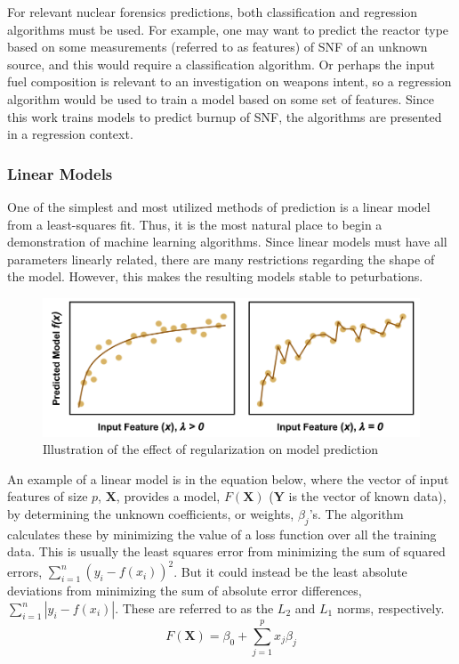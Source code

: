 \setlength\abovedisplayskip{2.5pt}

For relevant nuclear forensics predictions, both classification and regression
algorithms must be used.  For example, one may want to predict the reactor type
based on some measurements (referred to as features) of \gls{SNF} of an unknown
source, and this would require a classification algorithm. Or perhaps the input
fuel composition is relevant to an investigation on weapons intent, so a
regression algorithm would be used to train a model based on some set of
features.  Since this work trains models to predict burnup of \gls{SNF}, the
algorithms are presented in a regression context.

\subsubsection{Linear Models}
\label{sec:linear}

One of the simplest and most utilized methods of prediction is a linear model
from a least-squares fit. Thus, it is the most natural place to begin a
demonstration of machine learning algorithms. Since linear models must have all
parameters linearly related, there are many restrictions regarding the shape of
the model. However, this makes the resulting models stable to peturbations. 

\begin{figure}[!htb]
  \centering
  \includegraphics[width=\linewidth]{./chapters/litrev/regularization.png}
  \caption{Illustration of the effect of regularization on model prediction}
  \label{fig:reg}
\end{figure}

An example of a linear model is in the equation below, where the vector of
input features of size $p$, $\boldsymbol{X}$, provides a model,
$F(\boldsymbol{X})$ ($\boldsymbol{Y}$ is the vector of known
data), by determining the unknown coefficients, or weights,
$\beta_{j}$'s. The algorithm calculates these by minimizing the value of a loss
function over all the training data.  This is usually the least squares error
from minimizing the sum of squared errors, $\sum_{i=1}^{n} (y_i - f(x_i))^2$.
But it could instead be the least absolute deviations from minimizing the sum
of absolute error differences, $\sum_{i=1}^{n} |y_i - f(x_i)|$. These are
referred to as the $L_2$ and $L_1$ norms, respectively.  
\begin{equation}
  F(\boldsymbol{X}) = \beta_{0} +  \sum_{j=1}^{p} x_{j} \beta_{j}
\end{equation}

